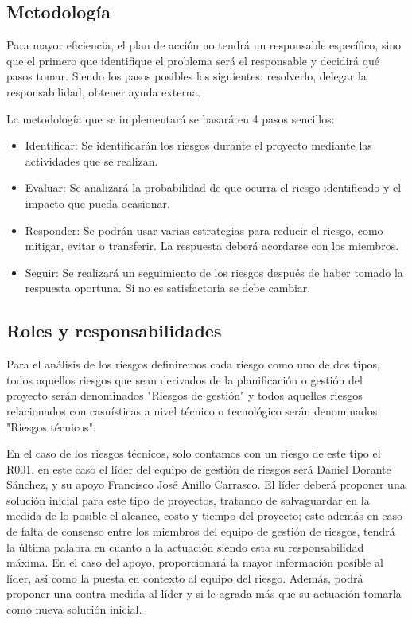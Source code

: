 \subsection{Metodología}

Para mayor eficiencia, el plan de acción no tendrá un responsable específico, sino que el primero que identifique el problema será el responsable y decidirá qué pasos tomar. Siendo los pasos posibles los siguientes: resolverlo, delegar la responsabilidad, obtener ayuda externa.

La metodología que se implementará se basará en 4 pasos sencillos:

\begin{itemize}
    \item Identificar: Se identificarán los riesgos durante el proyecto mediante las actividades que se realizan.
    \item Evaluar: Se analizará la probabilidad de que ocurra el riesgo identificado y el impacto que pueda ocasionar.
    \item Responder: Se podrán usar varias estrategias para reducir el riesgo, como mitigar, evitar o transferir. La respuesta deberá acordarse con los miembros.
    \item Seguir: Se realizará un seguimiento de los riesgos después de haber tomado la respuesta oportuna. Si no es satisfactoria se debe cambiar.
\end{itemize}

\subsection{Roles y responsabilidades}

Para el análisis de los riesgos definiremos cada riesgo como uno de dos tipos, todos aquellos riesgos que sean derivados de la planificación o gestión del proyecto serán denominados "Riesgos de gestión" y todos aquellos riesgos relacionados con casuísticas a nivel técnico o tecnológico serán denominados "Riesgos técnicos".

En el caso de los riesgos técnicos, solo contamos con un riesgo de este tipo el R001, en este caso el líder del equipo de gestión de riesgos será Daniel Dorante Sánchez, y su apoyo Francisco José Anillo Carrasco. 
El líder deberá proponer una solución inicial para este tipo de proyectos, tratando de salvaguardar en la medida de lo posible el alcance, costo y tiempo del proyecto; este además en caso de falta de consenso entre los miembros del equipo de gestión de riesgos, tendrá la última palabra en cuanto a la actuación siendo esta su responsabilidad máxima. En el caso del apoyo, proporcionará la mayor información posible al líder, así como la puesta en contexto al equipo del riesgo. Además, podrá proponer una contra medida al líder y si le agrada más que su actuación tomarla como nueva solución inicial. 

